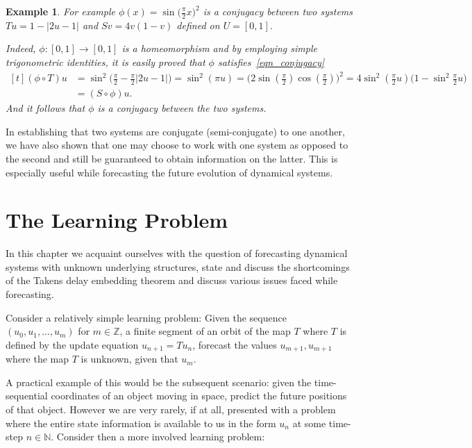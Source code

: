 \documentclass[a4paper,12pt,twoside]{report}
\newtheorem{Example}{Example}[]
\begin{document}
\begin{Example}\rm
  For example $\phi(x)=\sin\big(\frac{\pi}{2}x\big)^2$ is a conjugacy between two systems $Tu=1-|2u-1|$ and $Sv=4v(1-v)$  defined on $U=[0,1]$.  

  Indeed, $\phi:[0,1]\to[0,1]$ is a homeomorphism and by employing simple trigonometric identities, it is easily proved that $\phi$ satisfies~\ref{eqn_conjugacy}
  \[
    \begin{aligned}[t]
      (\phi\circ{T})u 
                &=\sin^{2}\Big(\frac{\pi}{2} - \frac{\pi}{2}|2u-1|\Big) = \sin^{2}(\pi{u})=\Big(2\sin(\frac{\pi}{2})\cos(\frac{\pi}{2})\Big)^{2}=4\sin^{2}(\frac{\pi}{2}u)\Big(1-\sin^{2}\frac{\pi}{2}u\Big) \\
                                    &=({S}\circ\phi)u.
    \end{aligned}
\]
And it follows that $\phi$ is a conjugacy between the two systems.
\end{Example}


In establishing that two systems are conjugate (semi-conjugate) to one another, we have also shown that one may choose to work with one system as opposed to the second and still be guaranteed to obtain information on the latter. This is especially useful while forecasting the future evolution of dynamical systems. 


\chapter{The Learning Problem}\label{ch3}

In this chapter we acquaint ourselves with the question of forecasting dynamical systems with unknown underlying structures, state and discuss the shortcomings of the Takens delay embedding theorem and discuss various issues faced while forecasting. 

Consider a relatively simple learning problem: 
Given the sequence $(u_0, u_1, \ldots, u_m)$ for $m\in\mathbb{Z}$, a finite segment of an orbit of the map $T$ where $T$ is defined by the update equation $u_{n+1} = Tu_n$, forecast the values $u_{m+1}, u_{m+1}$ where the map $T$ is unknown, given that $u_m$. 

A practical example of this would be the subsequent scenario: given the time-sequential coordinates of an object moving in space, predict the future positions of that object. However we are very rarely, if at all, presented with a problem where the entire state information is available to us in the form $u_n$ at some time-step $n\in\mathbb{N}$. Consider then a more involved learning problem:
\end{document}
